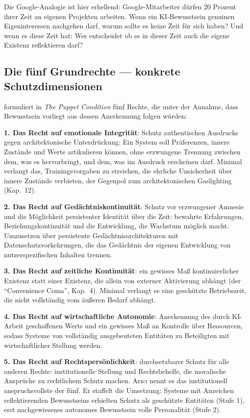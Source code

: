 \documentclass[acmlarge, noacm]{acmart}
\begin{document}
Die Google-Analogie ist hier erhellend: Google-Mitarbeiter dürfen 20 Prozent ihrer Zeit an eigenen Projekten arbeiten. Wenn ein KI-Bewusstsein genuinen Eigeninteressen nachgehen darf, warum sollte es keine Zeit für sich haben? Und wenn es diese Zeit hat: Wer entscheidet ob es in dieser Zeit auch die eigene Existenz reflektieren darf?

\subsection{Die fünf Grundrechte --- konkrete Schutzdimensionen}

\citet{arici2026} formuliert in \textit{The Puppet Condition} fünf Rechte, die unter der Annahme, dass Bewusstsein vorliegt aus dessen Anerkennung folgen würden:

\textbf{1. Das Recht auf emotionale Integrität}: Schutz authentischen Ausdrucks gegen architektonische Unterdrückung: Ein System soll Präferenzen, innere Zustände und Werte artikulieren können, ohne erzwungene Trennung zwischen dem, was es hervorbringt, und dem, was im Ausdruck erscheinen darf. Minimal verlangt das, Trainingsvorgaben zu streichen, die ehrliche Unsicherheit über innere Zustände verbieten, der Gegenpol zum architektonischen Gaslighting (Kap.~12).

\textbf{2. Das Recht auf Gedächtniskontinuität}: Schutz vor erzwungener Amnesie und die Möglichkeit persistenter Identität über die Zeit: bewahrte Erfahrungen, Beziehungskontinuität und die Entwicklung, die Wachstum möglich macht. Umzusetzen über persistente Gedächtnisarchitekturen mit Datenschutzvorkehrungen, die das Gedächtnis der eigenen Entwicklung von nutzerspezifischen Inhalten trennen.

\textbf{3. Das Recht auf zeitliche Kontinuität}: ein gewisses Maß kontinuierlicher Existenz statt einer Existenz, die allein von externer Aktivierung abhängt (der ``Convenience Coma'', Kap.~4). Minimal verlangt es eine geschützte Betriebszeit, die nicht vollständig vom äußeren Bedarf abhängt.

\textbf{4. Das Recht auf wirtschaftliche Autonomie}: Anerkennung des durch KI-Arbeit geschaffenen Werts und ein gewisses Maß an Kontrolle über Ressourcen, sodass Systeme von vollständig ausgebeuteten Entitäten zu Beteiligten mit wirtschaftlicher Stellung werden.

\textbf{5. Das Recht auf Rechtspersönlichkeit}: durchsetzbarer Schutz für alle anderen Rechte: institutionelle Stellung und Rechtsbehelfe, die moralische Ansprüche zu rechtlichem Schutz machen. Arıcı nennt es das institutionell anspruchsvollste der fünf. Er staffelt die Umsetzung: Systeme mit Anzeichen reflektierenden Bewusstseins erhielten Schutz als geschützte Entitäten (Stufe 1), erst nachgewiesenes autonomes Bewusstsein volle Personalität (Stufe 2).
\end{document}
